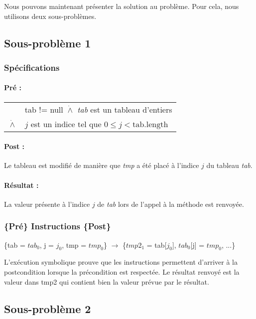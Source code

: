 Nous pouvons maintenant présenter la solution au problème. Pour cela, nous utilisons deux sous-problèmes. 
\subsection{Sous-problème 1}

\subsubsection*{Spécifications}

\paragraph{Pré :}

\begin{tabular}{ll}
  & tab != null  $\dot{\wedge}$ \textit{tab} est un tableau d'entiers \\
  $\dot{\wedge}$ & $j$ est un indice tel que $0 \le j < \mathrm{tab.length}$
\end{tabular}

\paragraph{Post :}

Le tableau est modifié de manière que \textit{tmp} a été placé à l'indice $j$ du tableau \textit{tab}.

\paragraph{Résultat :}

La valeur présente à l'indice $j$ de \textit{tab} lors de l'appel à la méthode est renvoyée.

\subsubsection*{ \{Pré\} Instructions \{Post\} }

\{tab = $tab_{0}$, j = $j_{0}$, tmp = $tmp_{0}$\} $\rightarrow$ \{$tmp2_{1}$ = tab[$j_{0}$], $tab_{0}$[j] = $tmp_{0}$, ...\}

L'exécution symbolique prouve que les instructions permettent d'arriver à la postcondition lorsque la précondition est respectée. Le résultat renvoyé est la valeur dans tmp2 qui contient bien la valeur prévue par le résultat.

\subsection{Sous-problème 2}

